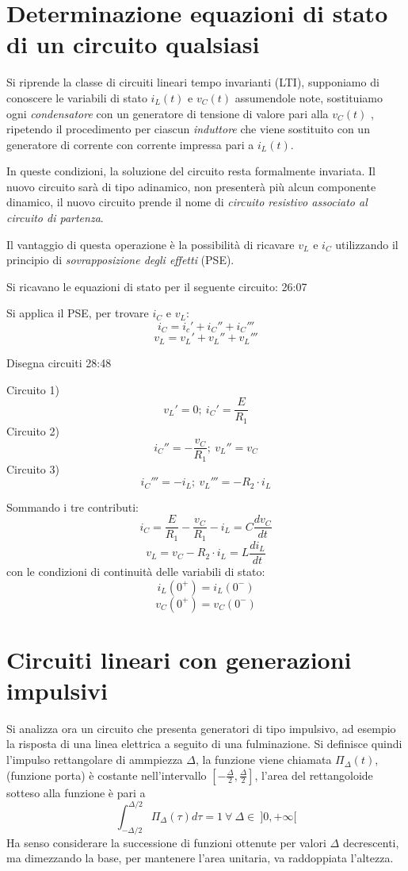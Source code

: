 \section{Determinazione equazioni di stato di un circuito qualsiasi}

Si riprende la classe di circuiti lineari tempo invarianti (LTI), supponiamo di conoscere
le variabili di stato $i_L(t) $ e $v_C(t) $ assumendole note, sostituiamo ogni \textit{condensatore}
con un generatore di tensione di valore pari alla $v_C(t)$ , ripetendo il procedimento
per ciascun \textit{induttore} che viene sostituito con un generatore di corrente con corrente impressa
pari a $i_L(t)$.

In queste condizioni, la soluzione del circuito resta formalmente invariata.
Il nuovo circuito sarà di tipo adinamico, non presenterà più alcun componente dinamico, il nuovo circuito
prende il nome di \textit{circuito resistivo associato al circuito di partenza}.

Il vantaggio di questa operazione è la possibilità di ricavare $v_L$ e $i_C$ utilizzando il principio
di \textit{sovrapposizione degli effetti} (PSE).

Si ricavano le equazioni di stato per il seguente circuito:
26:07

\begin{figure}[h]

\end{figure}

Si applica il PSE, per trovare $i_C$ e $v_L$:
$$
i_C = i_c' + i_C'' + i_C '''
$$
$$
v_L = v_L' + v_L'' + v_L'''
$$

Disegna circuiti 28:48

Circuito 1)
$$
v_L' = 0;\ i_C' = \frac{E}{R_1} 
$$
Circuito 2)
$$
i_C'' = -\frac{v_C}{R_1};\ v_L'' = v_C
$$
Circuito 3)
$$
i_C''' = -i_L;\ v_L''' = -R_2\cdot i_L
$$

Sommando i tre contributi:
$$
i_C = \frac{E}{R_1} - \frac{v_C}{R_1} - i_L = C\frac{dv_C}{dt}
$$
$$
v_L = v_C - R_2\cdot i_L = L\frac{di_L}{dt}
$$
con le condizioni di continuità delle variabili di stato:
$$
i_L(0^+) = i_L(0^-)
$$
$$
v_C(0^+) = v_C(0^-)
$$

\section{Circuiti lineari con generazioni impulsivi}
Si analizza ora un circuito che presenta generatori di tipo impulsivo, ad esempio la risposta di 
una linea elettrica a seguito di una fulminazione.
Si definisce quindi l'impulso rettangolare di ammpiezza $\Delta$, la funzione viene chiamata 
$\Pi_\Delta(t)$,(funzione porta) è costante nell'intervallo $[-\frac{\Delta}{2},\frac{\Delta}{2}]$,
l'area del rettangoloide sotteso alla funzione è pari a
$$
\int_{-\Delta/2}^{\Delta/2}\Pi_\Delta(\tau)d\tau = 1\ \forall\ \Delta \in\ ]0,+\infty[
$$
Ha senso considerare la successione di funzioni ottenute per valori $\Delta$ decrescenti,
ma dimezzando la base, per mantenere l'area unitaria, va raddoppiata l'altezza.

